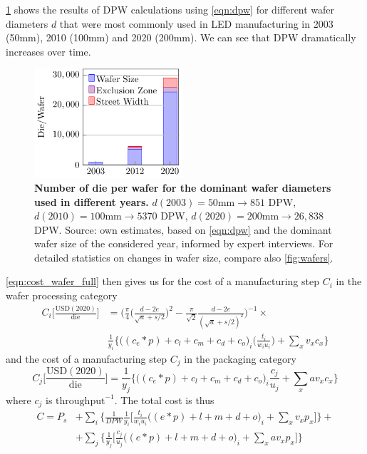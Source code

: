 \documentclass[parskip=full]{article}
\begin{document}
\cref{fig:dpw} shows the results of DPW calculations using \cref{eqn:dpw} for different wafer diameters $d$ that were most commonly used in LED manufacturing in 2003 (50mm), 2010 (100mm) and 2020 (200mm). We can see that DPW dramatically increases over time.

\begin{figure}[h!]
    \centering
    \includegraphics[width=5.5cm]{./figures/die-per-wafer.pdf}
    \caption{\textbf{Number of die per wafer for the dominant wafer diameters used in different years.} $d(2003)=50$mm$\rightarrow851$ DPW, $d(2010)=100$mm$\rightarrow5370$ DPW, $d(2020)=200$mm$\rightarrow26,838$ DPW. Source: own estimates, based on \cref{eqn:dpw} and the dominant wafer size of the considered year, informed by expert interviews. For detailed statistics on changes in wafer size, compare also \cref{fig:wafers}.}
    \label{fig:dpw}
\end{figure}

\cref{eqn:cost_wafer_full} then gives us for the cost of a manufacturing step $C_i$ in the wafer processing category
%
\begin{equation}
\label{eqn:cost_wafer_full}
\begin{split}
    C_i \bigg[ \frac{ \text{USD}(2020) }{ \text{die} } \bigg] &= \bigg (  \frac{\pi}{4}  \bigg ( \frac{d-2e}{\sqrt{a}+s/2} \bigg ) ^2 - \frac{\pi}{\sqrt{2}}\frac{d-2e}{(\sqrt{a}+s/2)^2} \bigg )^{-1} \times \\
    &  \frac{1}{y_i}  \bigg\{ \bigg((c_e*p) + c_l + c_m + c_d + c_o \bigg)_i \bigg( \frac{t_i}{w_i u_i} \bigg) + \sum_{x} v_x c_x \bigg\}
\end{split}
\end{equation}
%
and the cost of a manufacturing step $C_j$ in the packaging category
%
\begin{equation}
\label{eqn:cost_die}
    C_j \bigg[ \frac{ \text{USD}(2020) }{ \text{die} } \bigg] = \frac{1}{y_j}  \bigg\{ \bigg((c_e*p) + c_l + c_m + c_d + c_o \bigg)_i  \frac{c_j}{u_j} + \sum_{x} a v_x c_x \bigg\}
\end{equation}
where $c_j$ is $\text{throughput}^{-1}$. The total cost is thus
%
\begin{equation}
\label{eqn:cost_total}
\begin{split}
    C= P_s &+ \sum_i \bigg \{ \frac{1}{DPW} \frac{1}{y_i} \bigg[ \frac{t_i}{w_i u_i} \bigg((e*p) + l + m + d +o \bigg)_i  + \sum_{x} v_x p_x \bigg] \bigg \} + \\
    & + \sum_j \bigg \{ \frac{1}{y_j} \bigg[ \frac{c_j}{u_j}  \bigg((e*p) + l + m + d + o \bigg)_i + \sum_{x} a v_x p_x \bigg ] \bigg\}
\end{split}
\end{equation}
\end{document}
